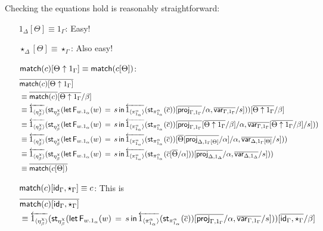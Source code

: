 \documentclass[10pt]{article}
\theoremstyle{definition}
\newcommand{\id}{\mathsf{id}}
\newcommand{\rewrite}[2]{\overleftarrow{#1}(#2)}
\newcommand\StI[2]{\ensuremath{\mathsf{st}_{#1}(#2)}}
\newcommand\FEs[4]{\ensuremath{\mathsf{let} \, \mathsf{F}_{#1}(#3) \, = \, {#2} \, \mathsf{in} \, #4}}
\begin{document}
Checking the equations hold is reasonably straightforward:
\begin{enumerate}[style = multiline, labelwidth = 80pt]
\item[{$1_\Delta[\Theta] \equiv 1_\Gamma$}:] Easy!
\item[{$\star_\Delta[\Theta] \equiv \star_\Gamma $}:] Also easy!
\item[{$\mathsf{match}(c)[\Theta \uparrow 1_\Gamma] \equiv \mathsf{match}(c[\Theta])$}:]
\begin{align*}
&\upstairs{\qunitmatch{c}[\Theta \uparrow 1_\Gamma]} \\
&\equiv \upstairs{\qunitmatch{c}}[\upstairs{\Theta \uparrow 1_\Gamma}/\beta] \\
&\equiv \rewrite{\ApOne{\eta^\chi_\beta}}{\StI{\eta^\chi_\beta}{\FEs{w.1_\alpha}{s}{w}{\rewrite{\ApOne{\pi^\alpha_{1_\alpha}}}{\StI{\pi^\alpha_{1_\alpha}}{\upstairs{c}}}}[\upstairs{\proj{\Gamma, 1_\Gamma}}/\alpha, \upstairs{\qvar{\Gamma, 1_\Gamma}}/s]}}[\upstairs{\Theta \uparrow 1_\Gamma}/\beta] \\
&\equiv \rewrite{\ApOne{\eta^\chi_\beta}}{\StI{\eta^\chi_\beta}{\FEs{w.1_\alpha}{s}{w}{\rewrite{\ApOne{\pi^\alpha_{1_\alpha}}}{\StI{\pi^\alpha_{1_\alpha}}{\upstairs{c}}}}[\upstairs{\proj{\Gamma, 1_\Gamma}}[\upstairs{\Theta \uparrow 1_\Gamma}/\beta]/\alpha, \upstairs{\qvar{\Gamma, 1_\Gamma}}[\upstairs{\Theta \uparrow 1_\Gamma}/\beta]/s]}} \\
&\equiv \rewrite{\ApOne{\eta^\chi_\beta}}{\StI{\eta^\chi_\beta}{\FEs{w.1_\alpha}{s}{w}{\rewrite{\ApOne{\pi^\alpha_{1_\alpha}}}{\StI{\pi^\alpha_{1_\alpha}}{\upstairs{c}}}}[\upstairs{\Theta}[\upstairs{\proj{\Delta, 1_\Gamma[\Theta]}}/\alpha]/\alpha, \upstairs{\qvar{\Delta, 1_\Gamma[\Theta]}}/s]}} \\
&\equiv \rewrite{\ApOne{\eta^\chi_\beta}}{\StI{\eta^\chi_\beta}{\FEs{w.1_\alpha}{s}{w}{\rewrite{\ApOne{\pi^\alpha_{1_\alpha}}}{\StI{\pi^\alpha_{1_\alpha}}{\upstairs{c}[\upstairs{\Theta}/\alpha]}}}[\upstairs{\proj{\Delta, 1_\Delta}}/\alpha, \upstairs{\qvar{\Delta, 1_\Delta}}/s]}} \\
&\equiv \upstairs{\qunitmatch{c[\Theta]}}
\end{align*}
\item[{$\qunitmatch{c}[\id_\Gamma, \star_\Gamma] \equiv c$}:] This is
\begin{align*}
&\upstairs{\qunitmatch{c}[\id_\Gamma, \star_\Gamma]} \\
&\equiv \rewrite{\ApOne{\eta^\chi_\beta}}{\StI{\eta^\chi_\beta}{\FEs{w.1_\alpha}{s}{w}{\rewrite{\ApOne{\pi^\alpha_{1_\alpha}}}{\StI{\pi^\alpha_{1_\alpha}}{\upstairs{c}}}}[\upstairs{\proj{\Gamma, 1_\Gamma}}/\alpha, \upstairs{\qvar{\Gamma, 1_\Gamma}}/s]}}[\upstairs{\id_\Gamma, \star_\Gamma}/\beta] \\

\end{align*}
\end{enumerate}
\end{document}
